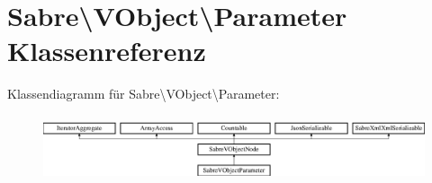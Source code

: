 \hypertarget{class_sabre_1_1_v_object_1_1_parameter}{}\section{Sabre\textbackslash{}V\+Object\textbackslash{}Parameter Klassenreferenz}
\label{class_sabre_1_1_v_object_1_1_parameter}
Klassendiagramm für Sabre\textbackslash{}V\+Object\textbackslash{}Parameter\+:\begin{figure}[H]
\begin{center}
\leavevmode
\includegraphics[height=1.976471cm]{class_sabre_1_1_v_object_1_1_parameter}
\end{center}
\end{figure}
